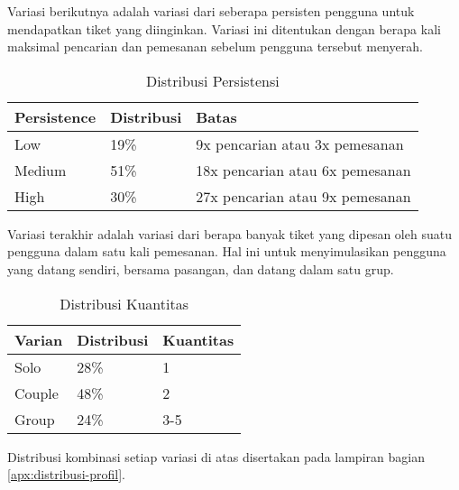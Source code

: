 Variasi berikutnya adalah variasi dari seberapa persisten pengguna untuk mendapatkan tiket yang diinginkan. Variasi ini ditentukan dengan berapa kali maksimal pencarian dan pemesanan sebelum pengguna tersebut menyerah.

\begin{table}[h]
    \centering
    \begin{tabular}{|l|l|l|}
        \hline
        \textbf{Persistence} & \textbf{Distribusi} & \textbf{Batas}                      \\
        \hline
        Low                  & 19\%                & 9x pencarian atau 3x pemesanan      \\
        \hline
        Medium               & 51\%                & 18x pencarian atau 6x     pemesanan \\
        \hline
        High                 & 30\%                & 27x pencarian atau 9x pemesanan     \\
        \hline
    \end{tabular}
    \caption{Distribusi Persistensi}
\end{table}

\pagebreak

Variasi terakhir adalah variasi dari berapa banyak tiket yang dipesan oleh suatu pengguna dalam satu kali pemesanan. Hal ini untuk menyimulasikan pengguna yang datang sendiri, bersama pasangan, dan datang dalam satu grup.

\begin{table}[h]
    \centering
    \begin{tabular}{|l|l|l|}
        \hline
        \textbf{Varian} & \textbf{Distribusi} & \textbf{Kuantitas} \\
        \hline
        Solo            & 28\%                & 1                  \\
        \hline
        Couple          & 48\%                & 2                  \\
        \hline
        Group           & 24\%                & 3-5                \\
        \hline
    \end{tabular}
    \caption{Distribusi Kuantitas}
\end{table}

Distribusi kombinasi setiap variasi di atas disertakan pada lampiran bagian \ref{apx:distribusi-profil}.